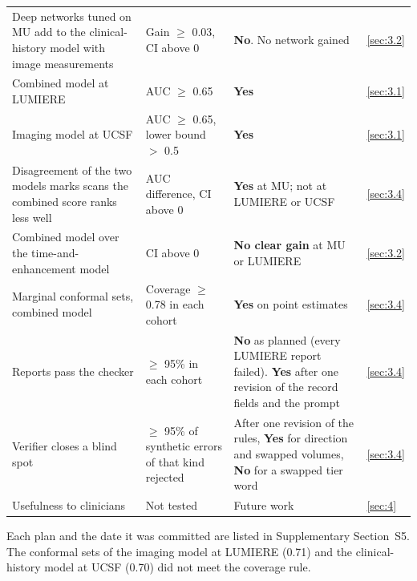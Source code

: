 \begin{table}[!htbp]
\begin{threeparttable}
\begin{tabularx}{\linewidth}{@{}R{4.0cm}R{3.9cm}LR{0.9cm}@{}}
Deep networks tuned on MU add to the clinical-history model with image measurements & Gain $\geq$ 0.03, CI above 0 & \textbf{No}. No network gained & \ref{sec:3.2} \\
Combined model at LUMIERE & AUC $\geq$ 0.65 & \textbf{Yes} & \ref{sec:3.1} \\
Imaging model at UCSF & AUC $\geq$ 0.65, lower bound $>$ 0.5 & \textbf{Yes} & \ref{sec:3.1} \\
Disagreement of the two models marks scans the combined score ranks less well & AUC difference, CI above 0 & \textbf{Yes} at MU; not at LUMIERE or UCSF & \ref{sec:3.4} \\
Combined model over the time-and-enhancement model & CI above 0 & \textbf{No clear gain} at MU or LUMIERE & \ref{sec:3.2} \\
Marginal conformal sets, combined model & Coverage $\geq$ 0.78 in each cohort & \textbf{Yes} on point estimates & \ref{sec:3.4} \\
Reports pass the checker & $\geq$ 95\% in each cohort & \textbf{No} as planned (every LUMIERE report failed). \textbf{Yes} after one revision of the record fields and the prompt & \ref{sec:3.4} \\
Verifier closes a blind spot & $\geq$ 95\% of synthetic errors of that kind rejected & After one revision of the rules, \textbf{Yes} for direction and swapped volumes, \textbf{No} for a swapped tier word & \ref{sec:3.4} \\
Usefulness to clinicians & Not tested & Future work & \ref{sec:4} \\
\bottomrule
\end{tabularx}
\begin{tablenotes}\footnotesize
\item Each plan and the date it was committed are listed in Supplementary Section~S5. The conformal sets of the imaging model at LUMIERE (0.71) and the clinical-history
model at UCSF (0.70) did not meet the coverage rule.
\end{tablenotes}
\end{threeparttable}
\end{table}

